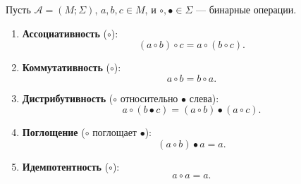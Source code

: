 Пусть $\mathcal{A} = (M; \Sigma)$, $a, b, c \in M$, и $\circ, \bullet \in \Sigma$ --- бинарные операции.

\begin{enumerate}
    \item \textbf{Ассоциативность} ($\circ$):
    $$(a \circ b) \circ c = a \circ (b \circ c).$$
    \item \textbf{Коммутативность} ($\circ$):
    $$a \circ b = b \circ a.$$
    \item \textbf{Дистрибутивность} ($\circ$ относительно $\bullet$ слева):
    $$a \circ (b \bullet c) = (a \circ b) \bullet (a \circ c).$$
    \item \textbf{Поглощение} ($\circ$ поглощает $\bullet$):
    $$(a \circ b) \bullet a = a.$$
    \item \textbf{Идемпотентность} ($\circ$):
    $$a \circ a = a.$$
\end{enumerate}
